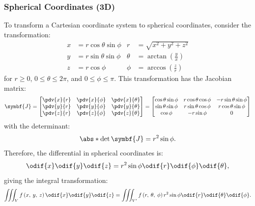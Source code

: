 \documentclass{article}
\begin{document}
\subsubsection{Spherical Coordinates (3D)}
To transform a Cartesian coordinate system to spherical coordinates,
consider the transformation:
\begin{align*}
    x & = r \cos{\theta} \sin{\phi} & r      & = \sqrt{x^2 + y^2 + z^2}              \\
    y & = r \sin{\theta} \sin{\phi} & \theta & = \arctan{\left( \frac{y}{x} \right)} \\
    z & = r \cos{\phi}              & \phi   & = \arccos{\left( \frac{z}{r} \right)}
\end{align*}
for \(r \geqslant 0\), \(0 \leqslant \theta \leqslant 2\pi\), and \(0 \leqslant \phi \leqslant \pi\).
This transformation has the Jacobian matrix:
\begin{equation*}
    \symbf{J} =
    \begin{bmatrix}
        \displaystyle\pdv{x}{r} & \displaystyle\pdv{x}{\phi} & \displaystyle\pdv{x}{\theta} \\
        \displaystyle\pdv{y}{r} & \displaystyle\pdv{y}{\phi} & \displaystyle\pdv{y}{\theta} \\
        \displaystyle\pdv{z}{r} & \displaystyle\pdv{z}{\phi} & \displaystyle\pdv{z}{\theta}
    \end{bmatrix}
    =
    \begin{bmatrix}
        \cos{\theta} \sin{\phi} & r \cos{\theta} \cos{\phi} & -r \sin{\theta} \sin{\phi} \\
        \sin{\theta} \sin{\phi} & r \sin{\theta} \cos{\phi} & r \cos{\theta} \sin{\phi}  \\
        \cos{\phi}              & -r \sin{\phi}             & 0
    \end{bmatrix}
\end{equation*}
with the determinant:
\begin{equation*}
    \abs*{\det{\symbf{J}}} = r^2 \sin{\phi}.
\end{equation*}
Therefore, the differential in spherical coordinates is:
\begin{equation*}
    \odif{x} \odif{y} \odif{z} = r^2 \sin{\phi} \odif{r} \odif{\phi} \odif{\theta},
\end{equation*}
giving the integral transformation:
\begin{equation*}
    \iiint_{V} f\left( x, \: y, \: z \right) \odif{x} \odif{y} \odif{z} = \iiint_{V'} f\left( r, \: \theta, \: \phi \right) r^2 \sin{\phi} \odif{r} \odif{\theta} \odif{\phi}.
\end{equation*}
\end{document}
